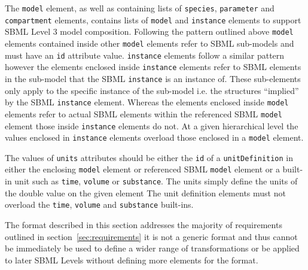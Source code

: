 \documentclass[10pt,twocolumntoc]{cekarticle}
\begin{document}
The \texttt{model} element, as well as containing lists of \texttt{species}, \texttt{parameter}
and \texttt{compartment} elements, contains lists of \texttt{model} and \texttt{instance}
elements to support SBML Level 3 model composition.  Following the pattern outlined above
\texttt{model} elements contained inside other \texttt{model} elements refer to SBML sub-models
and must have an \texttt{id} attribute value. \texttt{instance} elements follow a similar pattern
however the elements enclosed inside \texttt{instance} elements refer to SBML elements in the 
sub-model that the SBML \texttt{instance} is an instance of.  These sub-elements only apply to
the specific instance of the sub-model i.e. the structures ``implied'' by the SBML
\texttt{instance} element.  Whereas the elements enclosed inside \texttt{model} elements refer to
actual SBML elements within the referenced SBML \texttt{model} element those inside
\texttt{instance} elements do not.  At a given hierarchical level the values enclosed in
\texttt{instance} elements overload those enclosed in a \texttt{model} element.

The values of \texttt{units} attributes should be either the \texttt{id} of a
\texttt{unitDefinition} in either the enclosing \texttt{model} element or referenced
SBML \texttt{model} element or a built-in unit such as \texttt{time}, \texttt{volume} or
\texttt{substance}.  The units simply define the units of the double value on the given
element  The unit definition elements must not overload the \texttt{time}, \texttt{volume}
and \texttt{substance} built-ins.

The format described in this section addresses the majority of requirements outlined in
section~\ref{sec:requirements} it is not a generic format and thus cannot be immediately
be used to define a wider range of transformations or be applied to later SBML Levels
without defining more elements for the format.


\clearpage





\end{document}
